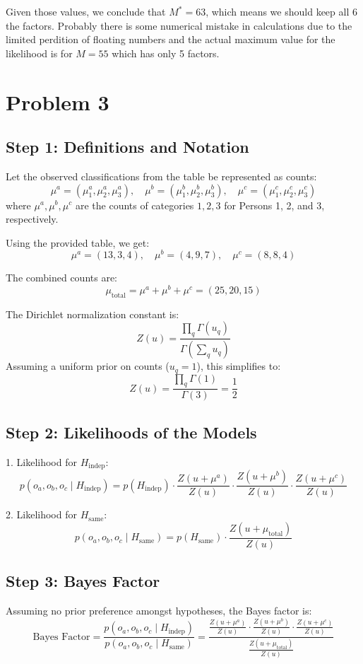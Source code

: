 \documentclass{article}
\begin{document}
Given those values, we conclude that $M^*=63$, which means we should keep all 6 the factors. Probably there is some numerical mistake in calculations due to the limited perdition of floating numbers and the actual maximum value for the likelihood is for $M=55$ which has only 5 factors. 

\section*{Problem 3}

\subsection*{Step 1: Definitions and Notation}

Let the observed classifications from the table be represented as counts:
\[
\mu^a = (\mu^a_1, \mu^a_2, \mu^a_3), \quad \mu^b = (\mu^b_1, \mu^b_2, \mu^b_3), \quad \mu^c = (\mu^c_1, \mu^c_2, \mu^c_3)
\]
where \(\mu^a, \mu^b, \mu^c\) are the counts of categories \(1, 2, 3\) for Persons 1, 2, and 3, respectively.

Using the provided table, we get:
\[
\mu^a = (13, 3, 4), \quad \mu^b = (4, 9, 7), \quad \mu^c = (8, 8, 4)
\]

The combined counts are:
\[
\mu_{\text{total}} = \mu^a + \mu^b + \mu^c = (25,20,15)
\]

The Dirichlet normalization constant is:
\[
Z(u) = \frac{\prod_q \Gamma(u_q)}{\Gamma\left(\sum_q u_q\right)}
\]
Assuming a uniform prior on counts (\(u_q = 1\)), this simplifies to:
\[
Z(u) = \frac{\prod_q \Gamma(1)}{\Gamma(3)} = \frac{1}{2}
\]

\subsection*{Step 2: Likelihoods of the Models}

1. Likelihood for \(H_{\text{indep}}\):
\[
p(o_a, o_b, o_c \mid H_{\text{indep}}) = p(H_{\text{indep}}) \cdot \frac{Z(u + \mu^a)}{Z(u)} \cdot \frac{Z(u + \mu^b)}{Z(u)} \cdot \frac{Z(u + \mu^c)}{Z(u)}
\]

2. Likelihood for \(H_{\text{same}}\):
\[
p(o_a, o_b, o_c \mid H_{\text{same}}) = p(H_{\text{same}}) \cdot \frac{Z(u + \mu_{\text{total}})}{Z(u)}
\]

\subsection*{Step 3: Bayes Factor}
Assuming no prior preference amongst hypotheses, the Bayes factor is:
\[
\text{Bayes Factor} = \frac{p(o_a, o_b, o_c \mid H_{\text{indep}})}{p(o_a, o_b, o_c \mid H_{\text{same}})} = 
\frac{\frac{Z(u + \mu^a)}{Z(u)} \cdot \frac{Z(u + \mu^b)}{Z(u)} \cdot \frac{Z(u + \mu^c)}{Z(u)}}{\frac{Z(u + \mu_{\text{total}})}{Z(u)}}
\]
\end{document}
